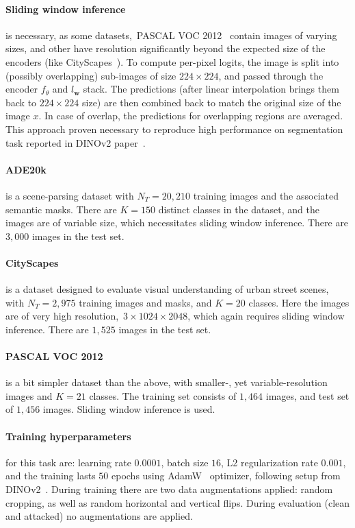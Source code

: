 \paragraph{Sliding window inference} is necessary, as some datasets,~\eg PASCAL VOC 2012~\cite{pascalvoc2012} contain images of varying sizes, and other have resolution significantly beyond the expected size of the encoders (like CityScapes~\cite{cityscapes}). To compute per-pixel logits, the image is split into (possibly overlapping) sub-images of size $224\times 224$, and passed through the encoder $f_\theta$ and $l_\mathbf{w}$ stack. The predictions (after linear interpolation brings them back to $224\times 224$ size) are then combined back to match the original size of the image $x$. In case of overlap, the predictions for overlapping regions are averaged. This approach proven necessary to reproduce high performance on segmentation task reported in DINOv2 paper~\cite{dinov2}.

\paragraph{ADE20k~\cite{ADE20k1,ADE20k2}} is a scene-parsing dataset with $N_T=20,210$ training images and the associated semantic masks. There are $K=150$ distinct classes in the dataset, and the images are of variable size, which necessitates sliding window inference. There are $3,000$ images in the test set.

\paragraph{CityScapes~\cite{cityscapes}} is a dataset designed to evaluate visual understanding of urban street scenes, with $N_T=2,975$ training images and masks, and $K=20$ classes. Here the images are of very high resolution,~\ie $3\times 1024\times 2048$, which again requires sliding window inference. There are $1,525$ images in the test set.

\paragraph{PASCAL VOC 2012~\cite{pascalvoc2012}} is a bit simpler dataset than the above, with smaller-, yet variable-resolution images and $K=21$ classes. The training set consists of $1,464$ images, and test set of $1,456$ images. Sliding window inference is used.


\paragraph{Training hyperparameters} for this task are: learning rate $0.0001$, batch size $16$, L2 regularization rate $0.001$, and the training lasts $50$ epochs using AdamW~\cite{adamw} optimizer, following setup from DINOv2~\cite{dinov2}. During training there are two data augmentations applied: random cropping, as well as random horizontal and vertical flips. During evaluation (clean and attacked) no augmentations are applied.

